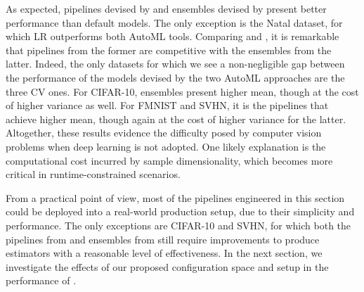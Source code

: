 As expected, pipelines devised by \isklearn and ensembles devised by \autosklearn present better performance than default models. The only exception is the Natal dataset, for which LR outperforms both AutoML tools. Comparing \isklearn and \autosklearn, it is remarkable that pipelines from the former are competitive with the ensembles from the latter. Indeed, the only datasets for which we see a non-negligible gap between the performance of the models devised by the two AutoML approaches are the three CV ones. For CIFAR-10, ensembles present higher mean, though at the cost of higher variance as well. For FMNIST and SVHN, it is the pipelines that achieve higher mean, though again at the cost of higher variance for the latter. Altogether, these results evidence the difficulty posed by computer vision problems when deep learning is not adopted. One likely explanation is the computational cost incurred by sample dimensionality, which becomes more critical in runtime-constrained scenarios. 

From a practical point of view, most of the pipelines engineered in this section could be deployed into a real-world production setup, due to their simplicity and performance. The only exceptions are CIFAR-10 and SVHN, for which both the pipelines from \isklearn and ensembles from \autosklearn still require improvements to produce estimators with a reasonable level of effectiveness.
In the next section, we investigate the effects of our proposed configuration space and setup in the performance of \isklearn.%
